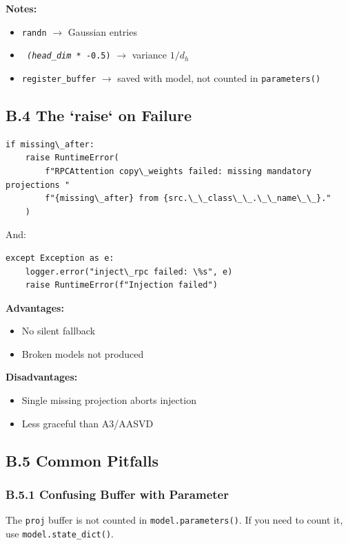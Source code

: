 \textbf{Notes:}
\begin{itemize}
\item \texttt{randn} $\to$ Gaussian entries
\item \texttt{\textit{ (head\_dim }* -0.5)} $\to$ variance $1/d_h$
\item \texttt{register\_buffer} $\to$ saved with model, not counted in \texttt{parameters()}

\end{itemize}
\subsection{B.4 The `raise` on Failure}

\begin{lstlisting}
if missing\_after:
    raise RuntimeError(
        f"RPCAttention copy\_weights failed: missing mandatory projections "
        f"{missing\_after} from {src.\_\_class\_\_.\_\_name\_\_}."
    )
\end{lstlisting}

And:

\begin{lstlisting}
except Exception as e:
    logger.error("inject\_rpc failed: \%s", e)
    raise RuntimeError(f"Injection failed")
\end{lstlisting}

\textbf{Advantages:}
\begin{itemize}
\item No silent fallback
\item Broken models not produced

\end{itemize}
\textbf{Disadvantages:}
\begin{itemize}
\item Single missing projection aborts injection
\item Less graceful than A3/AASVD

\end{itemize}
\subsection{B.5 Common Pitfalls}

\subsubsection{B.5.1 Confusing Buffer with Parameter}

The \texttt{proj} buffer is not counted in \texttt{model.parameters()}. If you need 
to count it, use \texttt{model.state\_dict()}.


